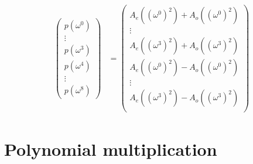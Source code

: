 \begin{align}
\begin{pmatrix}
p(\omega^0)\\
\vdots\\
p(\omega^3)\\
p(\omega^4)\\
\vdots\\
p(\omega^8)
\end{pmatrix}
&=
\begin{pmatrix}
A_e\left(\left(\omega^0\right)^2\right) + A_o\left(\left(\omega^0\right)^2\right) \\
\vdots \\
A_e\left(\left(\omega^3\right)^2\right) + A_o\left(\left(\omega^3\right)^2\right) \\
A_e\left(\left(\omega^0\right)^2\right) - A_o\left(\left(\omega^0\right)^2\right) \\
\vdots \\
A_e\left(\left(\omega^3\right)^2\right) - A_o\left(\left(\omega^3\right)^2\right) \\
\end{pmatrix}
\end{align}
\section{Polynomial multiplication}
